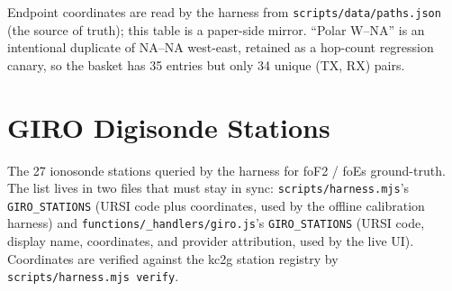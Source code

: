 \documentclass[11pt,a4paper]{article}
\begin{document}
Endpoint coordinates are read by the harness from
\texttt{scripts/data/paths.json} (the source of truth); this
table is a paper-side mirror.  ``Polar W--NA'' is an intentional
duplicate of NA--NA west-east, retained as a hop-count regression
canary, so the basket has 35 entries but only 34 unique
(TX, RX) pairs.

\section{GIRO Digisonde Stations}\label{app:giro}

The 27 ionosonde stations queried by the harness for foF2 / foEs
ground-truth.  The list lives in two files that must stay in sync:
\texttt{scripts/harness.mjs}'s \texttt{GIRO\_STATIONS} (URSI code
plus coordinates, used by the offline calibration harness) and
\texttt{functions/\_handlers/giro.js}'s \texttt{GIRO\_STATIONS} (URSI
code, display name, coordinates, and provider attribution, used by
the live UI).  Coordinates are verified against the kc2g station
registry by \texttt{scripts/harness.mjs verify}.
\end{document}

